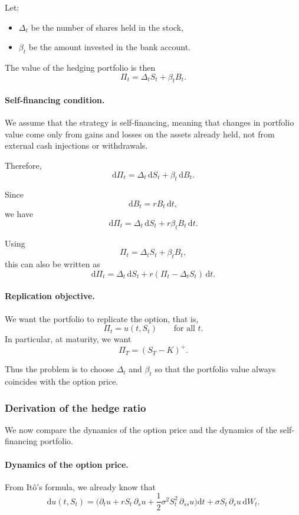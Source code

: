\documentclass[11pt]{article}
\theoremstyle{plain}
\theoremstyle{definition}
\theoremstyle{remark}
\begin{document}
Let:
\begin{itemize}[leftmargin=1.4em]
    \item \(\Delta_t\) be the number of shares held in the stock,
    \item \(\beta_t\) be the amount invested in the bank account.
\end{itemize}

The value of the hedging portfolio is then
\[
\Pi_t=\Delta_t S_t+\beta_t B_t.
\]

\paragraph{Self-financing condition.}
We assume that the strategy is self-financing, meaning that changes in
portfolio value come only from gains and losses on the assets already
held, not from external cash injections or withdrawals.

Therefore,
\[
\mathrm{d}\Pi_t=\Delta_t\,\mathrm{d}S_t+\beta_t\,\mathrm{d}B_t.
\]

Since
\[
\mathrm{d}B_t=rB_t\,\mathrm{d}t,
\]
we have
\[
\mathrm{d}\Pi_t=\Delta_t\,\mathrm{d}S_t+r\beta_t B_t\,\mathrm{d}t.
\]

Using
\[
\Pi_t=\Delta_t S_t+\beta_t B_t,
\]
this can also be written as
\[
\mathrm{d}\Pi_t
=
\Delta_t\,\mathrm{d}S_t+r(\Pi_t-\Delta_t S_t)\,\mathrm{d}t.
\]

\paragraph{Replication objective.}
We want the portfolio to replicate the option, that is,
\[
\Pi_t=u(t,S_t)
\qquad\text{for all }t.
\]
In particular, at maturity, we want
\[
\Pi_T=(S_T-K)^+.
\]

Thus the problem is to choose \(\Delta_t\) and \(\beta_t\) so that the
portfolio value always coincides with the option price.

\subsubsection{Derivation of the hedge ratio}

We now compare the dynamics of the option price and the dynamics of the
self-financing portfolio.

\paragraph{Dynamics of the option price.}
From It\^o's formula, we already know that
\[
\mathrm{d}u(t,S_t)
=
\Big(
\partial_t u
+
rS_t\,\partial_s u
+
\frac12 \sigma^2 S_t^2\,\partial_{ss}u
\Big)\mathrm{d}t
+
\sigma S_t\,\partial_s u\,\mathrm{d}W_t.
\]
\end{document}
